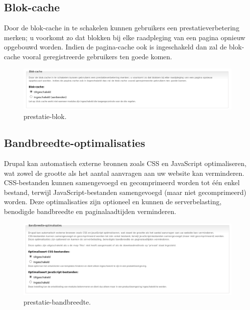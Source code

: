 \subsection{Blok-cache} 
  Door de blok-cache in te schakelen kunnen gebruikers een prestatieverbetering
  merken; u voorkomt zo dat blokken bij elke raadpleging van een pagina opnieuw opgebouwd worden. 
  Indien de pagina-cache ook is ingeschakeld dan zal de blok-cache vooral geregistreerde gebruikers ten goede komen.
\begin{figure}[!h]
    \centering
   \includegraphics[scale=0.3,angle=0]{prestatie-blok}
   \caption{prestatie-blok.\label{white}}
 \end{figure}
\subsection{Bandbreedte-optimalisaties} 
 Drupal kan automatisch externe bronnen zoals CSS en JavaScript optimaliseren,
wat zowel de grootte als het aantal aanvragen aan uw website kan verminderen. CSS-bestanden kunnen samengevoegd 
en gecomprimeerd worden tot \'e\'en enkel bestand, terwijl JavaScript-bestanden
samengevoegd (maar niet gecomprimeerd) worden. Deze optimalisaties zijn optioneel en kunnen de serverbelasting, benodigde bandbreedte en paginalaadtijden verminderen.
\begin{figure}[!h]
    \centering
   \includegraphics[scale=0.3,angle=0]{prestatie-bandbreedte}
   \caption{prestatie-bandbreedte.\label{white}}
 \end{figure}
